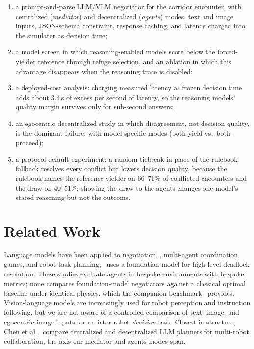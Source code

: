 \documentclass[journal]{IEEEtran}
\begin{document}
\begin{enumerate}
\item a prompt-and-parse LLM/VLM negotiator for the corridor encounter, with centralized (\emph{mediator}) and decentralized (\emph{agents}) modes, text and image inputs, JSON-schema constraint, response caching, and latency charged into the simulator as decision time;
\item a model screen in which reasoning-enabled models score below the forced-yielder reference through refuge selection, and an ablation in which this advantage disappears when the reasoning trace is disabled;
\item a deployed-cost analysis: charging measured latency as frozen decision time adds about 3.4\,s of excess per second of latency, so the reasoning models' quality margin survives only for sub-second answers;
\item an egocentric decentralized study in which disagreement, not decision quality, is the dominant failure, with model-specific modes (both-yield vs.\ both-proceed);
\item a protocol-default experiment: a random tiebreak in place of the rulebook fallback resolves every conflict but lowers decision quality, because the rulebook names the reference yielder on 66--71\% of conflicted encounters and the draw on 40--51\%; showing the draw to the agents changes one model's stated reasoning but not the outcome.
\end{enumerate}

\section{Related Work}
Language models have been applied to negotiation~\cite{marlin2024,gamechat2025}, multi-agent coordination games, and robot task planning;~\cite{garg2024llm} uses a foundation model for high-level deadlock resolution. These studies evaluate agents in bespoke environments with bespoke metrics; none compares foundation-model negotiators against a classical optimal baseline under identical physics, which the companion benchmark~\cite{paper1} provides. Vision-language models are increasingly used for robot perception and instruction following, but we are not aware of a controlled comparison of text, image, and egocentric-image inputs for an inter-robot \emph{decision} task. Closest in structure, Chen et al.~\cite{chen2024scalable} compare centralized and decentralized LLM planners for multi-robot collaboration, the axis our mediator and agents modes span.
\end{document}
